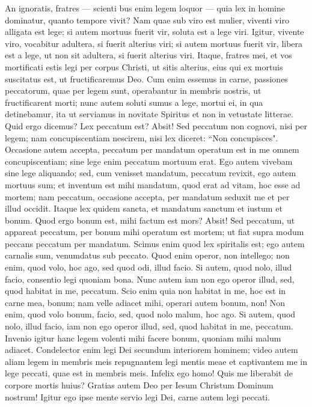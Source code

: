 \begin{biblechapter}  
\verse An ignoratis, fratres — scienti bus enim legem loquor — quia lex in homine dominatur, quanto tempore vivit? 
\verse Nam quae sub viro est mulier, viventi viro alligata est lege; si autem mortuus fuerit vir, soluta est a lege viri. 
\verse Igitur, vivente viro, vocabitur adultera, si fuerit alterius viri; si autem mortuus fuerit vir, libera est a lege, ut non sit adultera, si fuerit alterius viri. 
\verse Itaque, fratres mei, et vos mortificati estis legi per corpus Christi, ut sitis alterius, eius qui ex mortuis suscitatus est, ut fructificaremus Deo. 
\verse Cum enim essemus in carne, passiones peccatorum, quae per legem sunt, operabantur in membris nostris, ut fructificarent morti; 
\verse nunc autem soluti sumus a lege, mortui ei, in qua detinebamur, ita ut serviamus in novitate Spiritus et non in vetustate litterae. 
\verse Quid ergo dicemus? Lex peccatum est? Absit! Sed peccatum non cognovi, nisi per legem; nam concupiscentiam nescirem, nisi lex diceret: “Non concupisces". 
\verse Occasione autem accepta, peccatum per mandatum operatum est in me omnem concupiscentiam; sine lege enim peccatum mortuum erat. 
\verse Ego autem vivebam sine lege aliquando; sed, cum venisset mandatum, peccatum revixit, 
\verse ego autem mortuus sum; et inventum est mihi mandatum, quod erat ad vitam, hoc esse ad mortem; 
\verse nam peccatum, occasione accepta, per mandatum seduxit me et per illud occidit. 
\verse Itaque lex quidem sancta, et mandatum sanctum et iustum et bonum. 
\verse Quod ergo bonum est, mihi factum est mors? Absit! Sed peccatum, ut appareat peccatum, per bonum mihi operatum est mortem; ut fiat supra modum peccans peccatum per mandatum. 
\verse Scimus enim quod lex spiritalis est; ego autem carnalis sum, venumdatus sub peccato. 
\verse Quod enim operor, non intellego; non enim, quod volo, hoc ago, sed quod odi, illud facio. 
\verse Si autem, quod nolo, illud facio, consentio legi quoniam bona. 
\verse Nunc autem iam non ego operor illud, sed, quod habitat in me, peccatum. 
\verse Scio enim quia non habitat in me, hoc est in carne mea, bonum; nam velle adiacet mihi, operari autem bonum, non! 
\verse Non enim, quod volo bonum, facio, sed, quod nolo malum, hoc ago. 
\verse Si autem, quod nolo, illud facio, iam non ego operor illud, sed, quod habitat in me, peccatum. 
\verse Invenio igitur hanc legem volenti mihi facere bonum, quoniam mihi malum adiacet.  
\verse Condelector enim legi Dei secundum interiorem hominem; 
\verse video autem aliam legem in membris meis repugnantem legi mentis meae et captivantem me in lege peccati, quae est in membris meis. 
\verse Infelix ego homo! Quis me liberabit de corpore mortis huius? 
\verse Gratias autem Deo per Iesum Christum Dominum nostrum! Igitur ego ipse mente servio legi Dei, carne autem legi peccati. 
\end{biblechapter}

